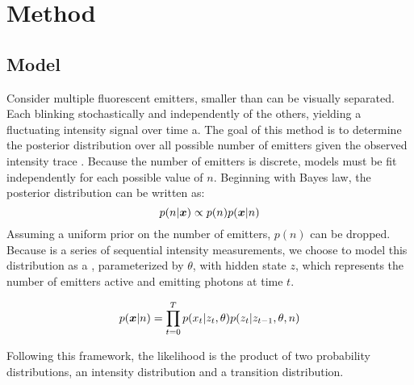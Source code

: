 \section{Method}


\subsection{Model}
Consider multiple fluorescent emitters, smaller than can be visually separated.
  Each blinking stochastically and independently of the others, 
  yielding a fluctuating intensity signal over time a.
  The goal of this method is to determine the posterior distribution over all
  possible number of emitters given the observed intensity trace \trace.
  Because the number of emitters is discrete, models must be fit independently for each possible value of $n$.
  Beginning with Bayes law, the posterior distribution can be written as:
  \begin{equation*}
    p(n | \bm{x}) \propto p(n) p(\bm{x} | n)
  \end{equation*}
  Assuming a uniform prior on the number of emitters, $p(n)$ can be dropped.
  Because \trace is a series of sequential intensity measurements, 
    we choose to model this distribution as a \hmm, parameterized by $\theta$,
     with hidden state $z$, which represents the number of emitters active and emitting photons at time $t$.
    
  \begin{equation}
    p(\bm{x}| n) = \prod_{t=0}^{T} p(x_{t} | z_{t}, \theta) p(z_{t} | z_{t-1}, \theta, n)
    \label{eq:method:HMM}
  \end{equation}

  Following this framework, the likelihood is the product of two probability distributions,
  an intensity distribution and a transition distribution.

